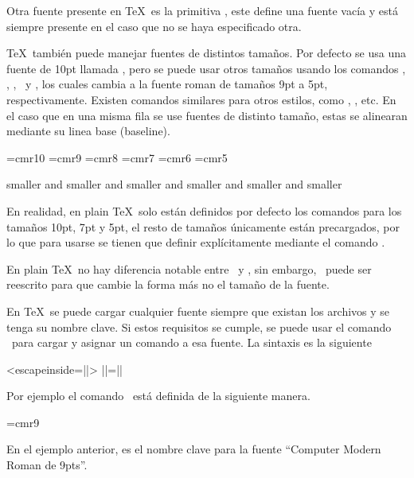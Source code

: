 Otra fuente presente en \TeX\ es la primitiva \texcs\nullfont, este define una fuente vacía y está siempre presente en el caso que no se haya especificado otra.

\TeX\ también puede manejar fuentes de distintos tamaños. Por defecto se usa una fuente de 10pt llamada \texcs\tenrm, pero se puede usar otros tamaños usando los comandos \texcs\ninerm, \texcs\eightrm, \texcs\sevenrm, \texcs\sixrm\ y \texcs\fiverm, los cuales cambia a la fuente roman de tamaños 9pt a 5pt, respectivamente. Existen comandos similares para otros estilos, como \texcs\tensl, \texcs\ninesl, etc. En el caso que en una misma fila se use fuentes de distinto tamaño, estas se alinearan mediante su linea base (baseline).

{
\font\tenrm=cmr10  \font\ninerm=cmr9  \font\eightrm=cmr8
\font\sevenrm=cmr7  \font\sixrm=cmr6  \font\fiverm=cmr5
\begin{texexample}
  \tenrm smaller \ninerm and smaller
  \eightrm and smaller \sevenrm and smaller
  \sixrm and smaller \fiverm and smaller
\end{texexample}
}

\begin{notebox}
  En realidad, en plain \TeX\ solo están definidos por defecto los comandos para los tamaños 10pt, 7pt y 5pt, el resto de tamaños únicamente están precargados, por lo que para usarse se tienen que definir explícitamente mediante el comando \texcs\font.
\end{notebox}


En plain \TeX\ no hay diferencia notable entre \texcs\rm\ y \texcs\tenrm, sin embargo, \texcs\rm\ puede ser reescrito para que cambie la forma más no el tamaño de la fuente.

En \TeX\ se puede cargar cualquier fuente siempre que existan los archivos y se tenga su nombre clave. Si estos requisitos se cumple, se puede usar el comando \texcs\font\ para cargar y asignar un comando a esa fuente. La sintaxis es la siguiente

\begin{texcode}<escapeinside=||>
  \font||=||
\end{texcode}

Por ejemplo el comando \texcs\ninerm\ está definida de la siguiente manera.
\begin{texcode}
  \font\ninerm=cmr9
\end{texcode}

En el ejemplo anterior,  es el nombre clave para la fuente ``Computer Modern Roman de 9pts''.

